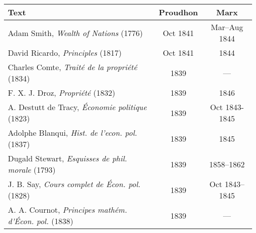 \begin{table}[ht!]
    \centering
    \begin{threeparttable}
    \begin{tabularx}{\linewidth}{Xcc}\toprule
        \textbf{Text} & \textbf{Proudhon} & \textbf{Marx} \\\midrule
        
        Adam Smith, \textit{Wealth of Nations} (1776) & Oct 1841 & Mar--Aug 1844 \\
        
        David Ricardo, \textit{Principles} (1817) & Oct 1841 & 1844 \\\midrule
        
        Charles Comte, \textit{Traité de la propriété} (1834) & 1839 & --- \\
        
        F. X. J. Droz, \textit{Propriété} (1832) & 1839 & 1846 \\
        
        A. Destutt de Tracy, \textit{Économie politique} (1823) & 1839 & Oct 1843-1845 \\
        
        Adolphe Blanqui, \textit{Hist. de l'econ. pol.} (1837) & 1839 & 1845 \\
        
        Dugald Stewart, \textit{Esquisses de phil. morale} (1793) & 1839 & 1858--1862 \\
        
        J. B. Say, \textit{Cours complet de Écon. pol.} (1828) & 1839 & Oct 1843--1845 \\
        
        A. A. Cournot, \textit{Principes mathém. d'Écon. pol.} (1838) & 1839 & --- \\
        

\end{tabularx}
\end{threeparttable}
\end{table}
